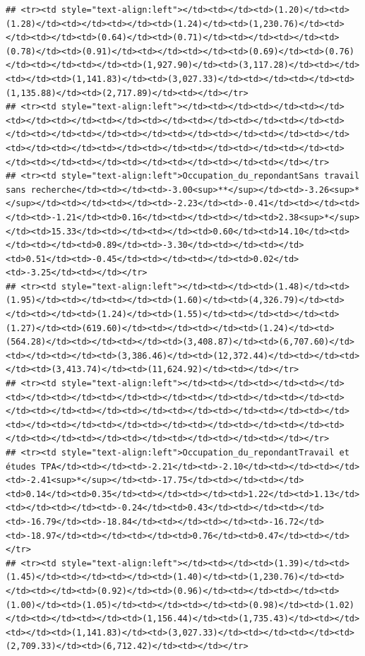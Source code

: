 \documentclass[
]{article}
\begin{document}
\begin{verbatim}
## <tr><td style="text-align:left"></td><td></td><td>(1.20)</td><td>(1.28)</td><td></td><td></td><td>(1.24)</td><td>(1,230.76)</td><td></td><td></td><td>(0.64)</td><td>(0.71)</td><td></td><td></td><td>(0.78)</td><td>(0.91)</td><td></td><td></td><td>(0.69)</td><td>(0.76)</td><td></td><td></td><td>(1,927.90)</td><td>(3,117.28)</td><td></td><td></td><td>(1,141.83)</td><td>(3,027.33)</td><td></td><td></td><td>(1,135.88)</td><td>(2,717.89)</td><td></td></tr>
## <tr><td style="text-align:left"></td><td></td><td></td><td></td><td></td><td></td><td></td><td></td><td></td><td></td><td></td><td></td><td></td><td></td><td></td><td></td><td></td><td></td><td></td><td></td><td></td><td></td><td></td><td></td><td></td><td></td><td></td><td></td><td></td><td></td><td></td><td></td><td></td></tr>
## <tr><td style="text-align:left">Occupation_du_repondantSans travail sans recherche</td><td></td><td>-3.00<sup>**</sup></td><td>-3.26<sup>*</sup></td><td></td><td></td><td>-2.23</td><td>-0.41</td><td></td><td></td><td>-1.21</td><td>0.16</td><td></td><td></td><td>2.38<sup>*</sup></td><td>15.33</td><td></td><td></td><td>0.60</td><td>14.10</td><td></td><td></td><td>0.89</td><td>-3.30</td><td></td><td></td><td>0.51</td><td>-0.45</td><td></td><td></td><td>0.02</td><td>-3.25</td><td></td></tr>
## <tr><td style="text-align:left"></td><td></td><td>(1.48)</td><td>(1.95)</td><td></td><td></td><td>(1.60)</td><td>(4,326.79)</td><td></td><td></td><td>(1.24)</td><td>(1.55)</td><td></td><td></td><td>(1.27)</td><td>(619.60)</td><td></td><td></td><td>(1.24)</td><td>(564.28)</td><td></td><td></td><td>(3,408.87)</td><td>(6,707.60)</td><td></td><td></td><td>(3,386.46)</td><td>(12,372.44)</td><td></td><td></td><td>(3,413.74)</td><td>(11,624.92)</td><td></td></tr>
## <tr><td style="text-align:left"></td><td></td><td></td><td></td><td></td><td></td><td></td><td></td><td></td><td></td><td></td><td></td><td></td><td></td><td></td><td></td><td></td><td></td><td></td><td></td><td></td><td></td><td></td><td></td><td></td><td></td><td></td><td></td><td></td><td></td><td></td><td></td><td></td></tr>
## <tr><td style="text-align:left">Occupation_du_repondantTravail et études TPA</td><td></td><td>-2.21</td><td>-2.10</td><td></td><td></td><td>-2.41<sup>*</sup></td><td>-17.75</td><td></td><td></td><td>0.14</td><td>0.35</td><td></td><td></td><td>1.22</td><td>1.13</td><td></td><td></td><td>-0.24</td><td>0.43</td><td></td><td></td><td>-16.79</td><td>-18.84</td><td></td><td></td><td>-16.72</td><td>-18.97</td><td></td><td></td><td>0.76</td><td>0.47</td><td></td></tr>
## <tr><td style="text-align:left"></td><td></td><td>(1.39)</td><td>(1.45)</td><td></td><td></td><td>(1.40)</td><td>(1,230.76)</td><td></td><td></td><td>(0.92)</td><td>(0.96)</td><td></td><td></td><td>(1.00)</td><td>(1.05)</td><td></td><td></td><td>(0.98)</td><td>(1.02)</td><td></td><td></td><td>(1,156.44)</td><td>(1,735.43)</td><td></td><td></td><td>(1,141.83)</td><td>(3,027.33)</td><td></td><td></td><td>(2,709.33)</td><td>(6,712.42)</td><td></td></tr>

\end{verbatim}
\end{document}
